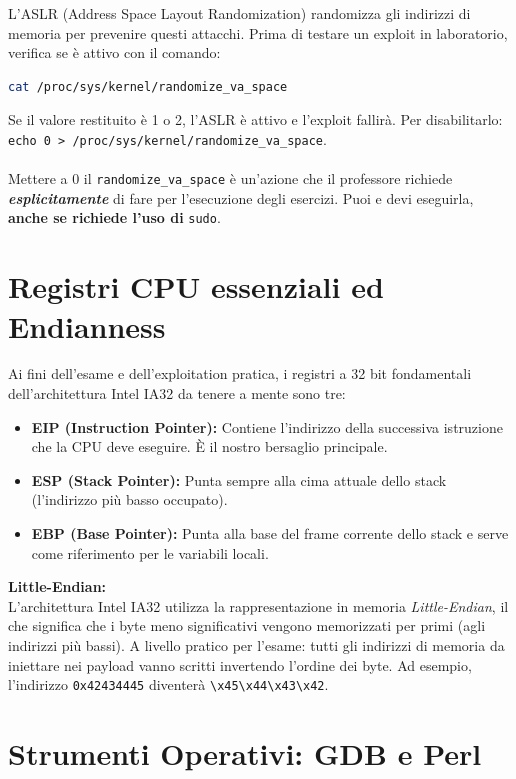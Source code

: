 \documentclass[12pt,a4paper]{report}
\begin{document}
	\begin{nota}
		L'ASLR (Address Space Layout Randomization) randomizza gli indirizzi di memoria per prevenire questi attacchi. Prima di testare un exploit in laboratorio, verifica se è attivo con il comando:
		\begin{lstlisting}[language=bash]
			cat /proc/sys/kernel/randomize_va_space
		\end{lstlisting}
		Se il valore restituito è 1 o 2, l'ASLR è attivo e l'exploit fallirà. Per disabilitarlo: \texttt{echo 0 > /proc/sys/kernel/randomize\_va\_space}.\\\\
		Mettere a 0 il \texttt{randomize\_va\_space} è un'azione che il professore richiede \textbf{\textit{esplicitamente}} di fare per l'esecuzione degli esercizi. Puoi e devi eseguirla, \textbf{anche se richiede l'uso di} \texttt{sudo}.
	\end{nota}
	
	\section{Registri CPU essenziali ed Endianness}
	Ai fini dell'esame e dell'exploitation pratica, i registri a 32 bit fondamentali dell'architettura Intel IA32 da tenere a mente sono tre:
	\begin{itemize}
		\item \textbf{EIP (Instruction Pointer):} Contiene l'indirizzo della successiva istruzione che la CPU deve eseguire. È il nostro bersaglio principale.
		\item \textbf{ESP (Stack Pointer):} Punta sempre alla cima attuale dello stack (l'indirizzo più basso occupato).
		\item \textbf{EBP (Base Pointer):} Punta alla base del frame corrente dello stack e serve come riferimento per le variabili locali.
	\end{itemize}
	\textbf{Little-Endian:}\\
	L'architettura Intel IA32 utilizza la rappresentazione in memoria \textit{Little-Endian}, il che significa che i byte meno significativi vengono memorizzati per primi (agli indirizzi più bassi). 
	A livello pratico per l'esame: tutti gli indirizzi di memoria da iniettare nei payload vanno scritti invertendo l'ordine dei byte. Ad esempio, l'indirizzo \texttt{0x42434445} diventerà \texttt{\textbackslash x45\textbackslash x44\textbackslash x43\textbackslash x42}.
	
	\section{Strumenti Operativi: GDB e Perl}
	
\end{document}
